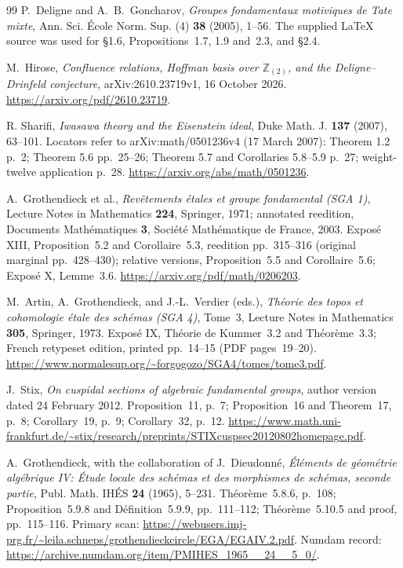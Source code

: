 \documentclass[11pt,a4paper]{article}
\theoremstyle{definition}
\begin{document}
\begin{thebibliography}{99}
P.~Deligne and A.~B.~Goncharov,
\emph{Groupes fondamentaux motiviques de Tate mixte},
Ann. Sci. \'Ecole Norm. Sup. (4) \textbf{38} (2005), 1--56.
The supplied LaTeX source was used for \S1.6,
Propositions~1.7, 1.9 and~2.3, and \S2.4.


M.~Hirose, \emph{Confluence relations, Hoffman basis over $\mathbb Z_{(2)}$,
and the Deligne--Drinfeld conjecture},
arXiv:2610.23719v1, 16 October 2026.
\url{https://arxiv.org/pdf/2610.23719}.


 R. Sharifi, \emph{Iwasawa theory and the Eisenstein ideal}, Duke Math. J. \textbf{137} (2007), 63--101. Locators refer to arXiv:math/0501236v4 (17 March 2007): Theorem 1.2 p.~2; Theorem 5.6 pp.~25--26; Theorem 5.7 and Corollaries 5.8--5.9 p.~27; weight-twelve application p.~28. \url{https://arxiv.org/abs/math/0501236}.

A.~Grothendieck et al., \emph{Rev\^etements \'etales et groupe fondamental
(SGA 1)}, Lecture Notes in Mathematics \textbf{224}, Springer, 1971;
annotated reedition, Documents Math\'ematiques \textbf{3},
Soci\'et\'e Math\'ematique de France, 2003.
Expos\'e XIII, Proposition~5.2 and Corollaire~5.3,
reedition pp.~315--316 (original marginal pp.~428--430);
relative versions, Proposition~5.5 and Corollaire~5.6;
Expos\'e X, Lemme~3.6.
\url{https://arxiv.org/pdf/math/0206203}.


M.~Artin, A.~Grothendieck, and J.-L.~Verdier (eds.),
\emph{Th\'eorie des topos et cohomologie \'etale des sch\'emas
(SGA 4)}, Tome~3, Lecture Notes in Mathematics \textbf{305},
Springer, 1973. Expos\'e IX, Th\'eorie de Kummer~3.2 and
Th\'eor\`eme~3.3; French retypeset edition, printed pp.~14--15
(PDF pages~19--20).
\url{https://www.normalesup.org/~forgogozo/SGA4/tomes/tome3.pdf}.


J.~Stix, \emph{On cuspidal sections of algebraic fundamental groups},
author version dated 24 February 2012.
Proposition~11, p.~7; Proposition~16 and Theorem~17, p.~8;
Corollary~19, p.~9; Corollary~32, p.~12.
\url{https://www.math.uni-frankfurt.de/~stix/research/preprints/STIXcuspsec20120802homepage.pdf}.


A.~Grothendieck, with the collaboration of J.~Dieudonn\'e,
\emph{\'El\'ements de g\'eom\'etrie alg\'ebrique IV:
\'Etude locale des sch\'emas et des morphismes de sch\'emas,
seconde partie}, Publ. Math. IH\'ES \textbf{24} (1965), 5--231.
Th\'eor\`eme~5.8.6, p.~108; Proposition~5.9.8 and
D\'efinition~5.9.9, pp.~111--112;
Th\'eor\`eme~5.10.5 and proof, pp.~115--116.
Primary scan:
\url{https://webusers.imj-prg.fr/~leila.schneps/grothendieckcircle/EGA/EGAIV.2.pdf}.
Numdam record: \url{https://archive.numdam.org/item/PMIHES_1965__24__5_0/}.


\end{thebibliography}
\end{document}
